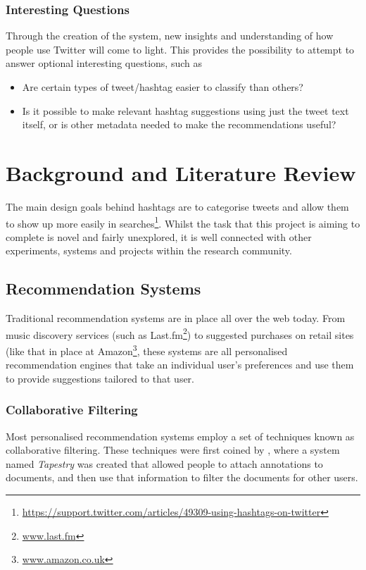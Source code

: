 \documentclass[12pt,a4paper]{article}
\begin{document}
\subsubsection{Interesting Questions}
Through the creation of the system, new insights and understanding of how people use Twitter will come to light. This provides the possibility to attempt to answer optional interesting questions, such as
\begin{itemize}
    \item Are certain types of tweet/hashtag easier to classify than others?
    \item Is it possible to make relevant hashtag suggestions using just the tweet text itself, or is other metadata needed to make the recommendations useful?
\end{itemize}
\pagebreak

\section{Background and Literature Review}
The main design goals behind hashtags are to categorise tweets and allow them to show up more easily in searches\footnote{\url{https://support.twitter.com/articles/49309-using-hashtags-on-twitter}}. Whilst the task that this project is aiming to complete is novel and fairly unexplored, it is well connected with other experiments, systems and projects within the research community.

\subsection{Recommendation Systems}
Traditional recommendation systems are in place all over the web today. From music discovery services (such as Last.fm\footnote{\url{www.last.fm}}) to suggested purchases on retail sites (like that in place at Amazon\footnote{\url{www.amazon.co.uk}}, these systems are all personalised recommendation engines that take an individual user's preferences and use them to provide suggestions tailored to that user.

\subsubsection{Collaborative Filtering}
Most personalised recommendation systems employ a set of techniques known as collaborative filtering. These techniques were first coined by \textcite{Goldberg:1992}, where a system named \emph{Tapestry} was created that allowed people to attach annotations to documents, and then use that information to filter the documents for other users.
\end{document}
